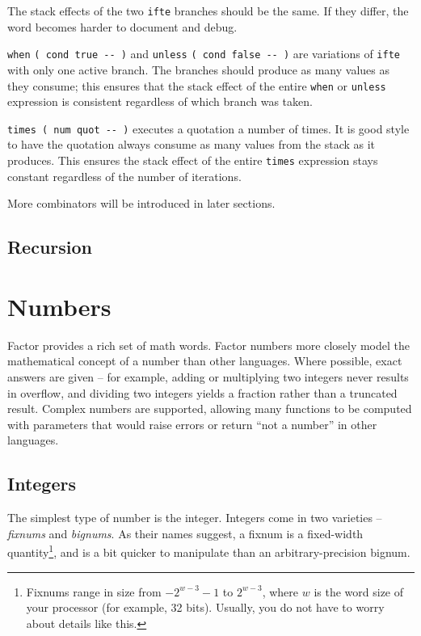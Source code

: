 \documentclass[english]{article}
\begin{document}
The stack effects of the two \texttt{ifte} branches should be
the same. If they differ, the word becomes harder to document and
debug.

\texttt{when} \texttt{( cond true -{}- )} and \texttt{unless} \texttt{( cond false -{}- )} are variations of \texttt{ifte} with only one active branch. The branches should produce as many values as they consume; this ensures that the stack effect of the entire \texttt{when} or \texttt{unless} expression is consistent regardless of which branch was taken.

\texttt{times ( num quot -{}- )} executes a quotation a number of
times. It is good style to have the quotation always consume as many
values from the stack as it produces. This ensures the stack effect
of the entire \texttt{times} expression stays constant regardless
of the number of iterations.

More combinators will be introduced in later sections.

\subsection{Recursion}

\section{Numbers}

Factor provides a rich set of math words. Factor numbers more closely model the mathematical concept of a number than other languages. Where possible, exact answers are given -- for example, adding or multiplying two integers never results in overflow, and dividing two integers yields a fraction rather than a truncated result. Complex numbers are supported, allowing many functions to be computed with parameters that would raise errors or return ``not a number'' in other languages.

\subsection{Integers}

The simplest type of number is the integer. Integers come in two varieties -- \emph{fixnums} and \emph{bignums}. As their names suggest, a fixnum is a fixed-width quantity\footnote{Fixnums range in size from $-2^{w-3}-1$ to $2^{w-3}$, where $w$ is the word size of your processor (for example, 32 bits). Usually, you do not have to worry about details like this.}, and is a bit quicker to manipulate than an arbitrary-precision bignum.
\end{document}
